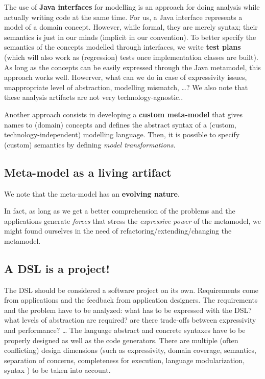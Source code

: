 \documentclass[11pt]{article}
\begin{document}
The use of \textbf{Java interfaces} for modelling is an approach for doing
analysis while actually writing code at the same time. For us, a Java interface
represents a model of a domain concept. However, while formal, they are merely
syntax; their semantics is just in our minds (implicit in our convention). To
better specify the semantics of the concepts modelled through interfaces, we 
write \textbf{test plans} (which will also work as (regression) tests once
implementation classes are built). \\

As long as the concepts can be easily expressed through the Java
metamodel, this approach works well. Howerver, what can we do in case of
expressivity issues, unappropriate level of abstraction, modelling
mismatch, \ldots? We also note that these analysis artifacts are not very
technology-agnostic..

Another approach consists in developing a \textbf{custom meta-model} that
 gives names to (domain) concepts and defines the abstract syntax of
 a (custom, technology-independent) modelling language. Then, it is possible to
 specify (custom) semantics by defining \emph{model transformations}.


\subsection{Meta-model as a living artifact} 

We note that the meta-model has an \textbf{evolving nature}.

 In fact, as long as we get a better comprehension of the problems and the
  applications generate \emph{forces} that stress the \emph{expressive power} of
  the metamodel, we might found ourselves in the need of
  refactoring/extending/changing the metamodel.
    
\subsection{A DSL is a project!}

The DSL should be considered a software project on its own. 
  Requirements come from applications and the feedback from application
  designers. The requirements and the problem have to be analyzed:
  what has to be expressed with the DSL? what levels of abstraction are
  required? are there trade-offs between expressivity and performance? \ldots 
  The language abstract and concrete syntaxes have to be properly designed as
  well as the code generators. There are multiple (often conflicting) design
  dimensions (such as expressivity, domain coverage, semantics, separation of
  concerns, completeness for execution, language modularization, syntax \cite{dsleng}) to
  be taken into account.
\end{document}
